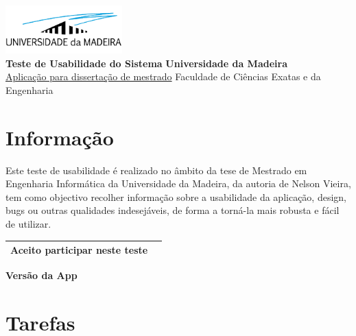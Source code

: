 \documentclass[12pt,a4paper]{article}
\date{}
\begin{document}
\noindent
\hfill \includegraphics[width=4.5cm]{assets/images/uma_logo.png} \\
\normalsize
\textbf{Teste de Usabilidade do Sistema} \hfill \textbf{Universidade da Madeira} \\
\footnotesize
\hyperlink{project_link}{Aplicação para dissertação de mestrado} \hfill Faculdade de Ciências Exatas e da Engenharia \\

\section*{Informação}

Este teste de usabilidade é realizado no âmbito da tese de Mestrado em Engenharia
Informática da Universidade da Madeira, da autoria de Nelson Vieira, tem como
objectivo recolher informação sobre a usabilidade da aplicação, design, bugs ou
outras qualidades indesejáveis, de forma a torná-la mais robusta e fácil de utilizar.

\vspace{1cm}

\begin{tabular}{|m{10cm}|m{1cm}|}
    \hline
    Aceito participar neste teste & \\
    \hline
\end{tabular}

\vspace{1cm}

\textbf{Versão da App}

\clearpage

\section*{Tarefas}
\end{document}
